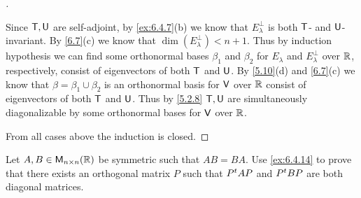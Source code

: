 \begin{proof}[]
\begin{itemize}
          Since \(\mathsf{T}, \mathsf{U}\) are self-adjoint, by \cref{ex:6.4.7}(b) we know that \(E_{\lambda}^{\perp}\) is both \(\mathsf{T}\)- and \(\mathsf{U}\)-invariant.
          By \cref{6.7}(c) we know that \(\dim(E_{\lambda}^{\perp}) < n + 1\).
          Thus by induction hypothesis we can find some orthonormal bases \(\beta_1\) and \(\beta_2\) for \(E_{\lambda}\) and \(E_{\lambda}^{\perp}\) over \(\mathbb{R}\), respectively, consist of eigenvectors of both \(\mathsf{T}\) and \(\mathsf{U}\).
          By \cref{5.10}(d) and \cref{6.7}(c) we know that \(\beta = \beta_1 \cup \beta_2\) is an orthonormal basis for \(\mathsf{V}\) over \(\mathbb{R}\) consist of eigenvectors of both \(\mathsf{T}\) and \(\mathsf{U}\).
          Thus by \cref{5.2.8} \(\mathsf{T}, \mathsf{U}\) are simultaneously diagonalizable by some orthonormal bases for \(\mathsf{V}\) over \(\mathbb{R}\).
  \end{itemize}
  From all cases above the induction is closed.
\end{proof}

\begin{ex}\label{ex:6.4.15}
  Let \(A, B \in \ms[n][n][\R]\) be symmetric such that \(AB = BA\).
  Use \cref{ex:6.4.14} to prove that there exists an orthogonal matrix \(P\) such that \({P}^{t} A P\) and \({P}^{t} B P\) are both diagonal matrices.
\end{ex}

